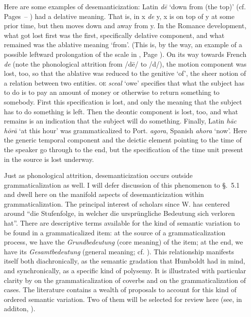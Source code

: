 Here are some examples of desemanticization: Latin \textit{d\=e} ‘down from (the top)’ (cf. Pages~\pageref{page78b}--\pageref{page79}\chk%
) had a delative meaning. That is, in x \textit{de} y, x is on top of y at some prior time, but then moves down and away from y. In the Romance development, what got lost first was the first, specifically delative component, and what remained was the ablative meaning ‘from’. (This is, by the way, an example of a possible leftward prolongation of the scale in , Page \pageref{F8}). On its way towards French \textit{de} (note the phonological attrition from /d\=e/ to /d/), the motion component was lost, too, so that the ablative was reduced to the genitive ‘of’, the sheer notion of a relation between two entities. \textsc{oe} \textit{sceal} ‘owe’ specifies that what the subject has to do is to pay an amount of money or otherwise to return something to somebody. First this specification is lost, and only the meaning that the subject has to do something is left. Then the deontic component is lost, too, and what remains is an indication that the subject will do something. Finally, Latin \textit{h\=ac h\=or\=a} ‘at this hour’ was grammaticalized to Port. \textit{agora}, Spanish \textit{ahora} ‘now’. Here the generic temporal component and the deictic element pointing to the time of the speaker go through to the end, but the specification of the time unit present in the source is lost underway.

Just as phonological attrition, desemanticization occurs outside grammaticalization as well. I will defer discussion of this phenomenon to §.~5.1 and dwell here on the manifold aspects of desemanticization within grammaticalization. The principal interest of scholars since W. \citet[52]{Humboldt1822} has centered around “die Stufenfolge, in welcher die ursprüngliche Bedeutung sich verloren hat”.  There are descriptive terms available for the kind of semantic variation to be found in a grammaticalized item: at the source of a grammaticalization process, we have the \textit{Grundbedeutung} (core meaning) of the item; at the end, we have its \textit{Gesamtbedeutung} (general meaning; cf. \citealt{Jakobson1936}). This relationship manifests itself both diachronically, as the semantic gradation that Humboldt had in mind, and synchronically, as a specific kind of polysemy. It is illustrated with particular clarity by  on the grammaticalization of coverbs and  on the grammaticalization of cases. The literature contains a wealth of proposals to account for this kind of ordered semantic variation. Two of them will be selected for review here (see, in additon, \citealt{Traugott1980}).

